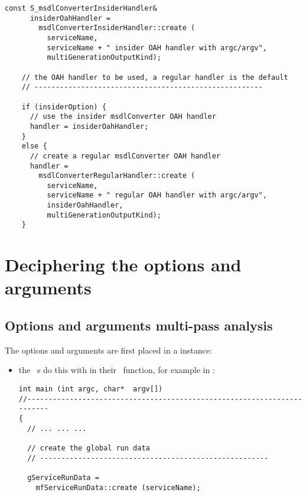{\begin{lstlisting}[language=CPlusPlus]
    const S_msdlConverterInsiderHandler&
      insiderOahHandler =
        msdlConverterInsiderHandler::create (
          serviceName,
          serviceName + " insider OAH handler with argc/argv",
          multiGenerationOutputKind);

    // the OAH handler to be used, a regular handler is the default
    // ------------------------------------------------------

    if (insiderOption) {
      // use the insider msdlConverter OAH handler
      handler = insiderOahHandler;
    }
    else {
      // create a regular msdlConverter OAH handler
      handler =
        msdlConverterRegularHandler::create (
          serviceName,
          serviceName + " regular OAH handler with argc/argv",
          insiderOahHandler,
          multiGenerationOutputKind);
    }
\end{lstlisting}


\section{Deciphering the options and arguments}

\subsection{Options and arguments multi-pass analysis}\label{Options and arguments multi-pass analysis}

The options and arguments are first placed in a  instance:
\begin{itemize}
\item the \CLI\ \service s do this with  in their \MainName\ function, for example in : %
\begin{lstlisting}[language=CPlusPlus]
int main (int argc, char*  argv[])
//------------------------------------------------------------------------
{
  // ... ... ...

  // create the global run data
  // ------------------------------------------------------

  gServiceRunData =
    mfServiceRunData::create (serviceName);


\end{lstlisting}
\end{itemize}}
